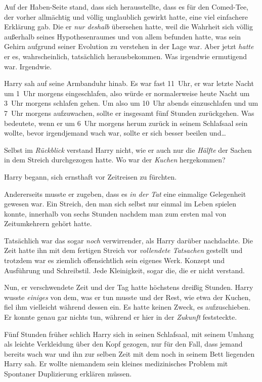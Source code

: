 {Auf der Haben-Seite stand, dass sich herausstellte, dass es für den Comed-Tee, der vorher allmächtig und völlig unglaublich gewirkt hatte, eine viel einfachere Erklärung gab. Die er \emph{nur deshalb} übersehen hatte, weil die Wahrheit sich völlig außerhalb seines Hypothesenraumes und von allem befunden hatte, was sein Gehirn aufgrund seiner Evolution zu verstehen in der Lage war. Aber jetzt \emph{hatte} er es, wahrscheinlich, tatsächlich herausbekommen. Was irgendwie ermutigend war. Irgendwie.

Harry sah auf seine Armbanduhr hinab. Es war fast 11~Uhr, er war letzte Nacht um 1~Uhr morgens eingeschlafen, also würde er normalerweise heute Nacht um 3~Uhr morgens schlafen gehen. Um also um 10~Uhr abends einzuschlafen und um 7~Uhr morgens aufzuwachen, sollte er insgesamt fünf Stunden zurückgehen. Was bedeutete, wenn er um 6~Uhr morgens herum zurück in seinem Schlafsaal sein wollte, bevor irgendjemand wach war, sollte er sich besser beeilen und…

Selbst im \emph{Rückblick} verstand Harry nicht, wie er auch nur die \emph{Hälfte} der Sachen in dem Streich durchgezogen hatte. Wo war der \emph{Kuchen} hergekommen?

Harry begann, sich ernsthaft vor Zeitreisen zu fürchten.

Andererseits musste er zugeben, dass es \emph{in der Tat} eine einmalige Gelegenheit gewesen war. Ein Streich, den man sich selbst nur einmal im Leben spielen konnte, innerhalb von sechs Stunden nachdem man zum ersten mal von Zeitumkehrern gehört hatte.

Tatsächlich war das sogar \emph{noch} verwirrender, als Harry darüber nachdachte. Die Zeit hatte ihn mit dem fertigen Streich vor \emph{vollendete Tatsachen} gestellt und trotzdem war es ziemlich offensichtlich sein eigenes Werk. Konzept und Ausführung und Schreibstil. Jede Kleinigkeit, sogar die, die er nicht verstand.

Nun, er verschwendete Zeit und der Tag hatte höchstens dreißig Stunden. Harry wusste \emph{einiges} von dem, was er tun musste und der Rest, wie etwa der Kuchen, fiel ihm vielleicht während dessen ein. Es hatte keinen Zweck, es aufzuschieben. Er konnte genau gar nichts tun, während er hier in der \emph{Zukunft} feststeckte.

\later

Fünf Stunden früher schlich Harry sich in seinen Schlafsaal, mit seinem Umhang als leichte Verkleidung über den Kopf gezogen, nur für den Fall, dass jemand bereits wach war und ihn zur selben Zeit mit dem noch in seinem Bett liegenden Harry sah. Er wollte niemandem sein kleines medizinisches Problem mit Spontaner Duplizierung erklären müssen.

}
